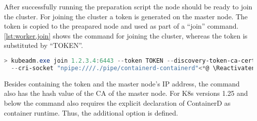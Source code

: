 %
%



After successfully running the preparation script the node should be ready to join the cluster. For joining the cluster a token is generated on the master node. The token is copied to the preapared node and used as part of a \enquote{join} command. \autoref{lst:worker.join} shows the command for joining the cluster, whereas the token is substituted by \enquote{TOKEN}.
\begin{lstlisting}[label=lst:worker.join, caption={Command for joining new nodes on Windows}, language=PowerShell, morekeywords={kubeadm.exe}]
> kubeadm.exe join 1.2.3.4:6443 --token TOKEN --discovery-token-ca-cert-hash sha256:HASH \<*@ \Suppressnumber @*>
  --cri-socket "npipe:////./pipe/containerd-containerd"<*@ \Reactivatenumber @*>
\end{lstlisting}
Besides containing the token and the master node's \ac{IP} address, the command also has the hash value of the \ac{CA} of the master node. For \ac{K8s} versions 1.25 and below the command also requires the explicit declaration of ContainerD as container runtime. Thus, the additional option  is defined.


